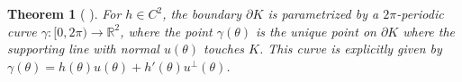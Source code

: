 \documentclass[11pt,letterpaper,reqno]{amsart}
\newcommand{\R}{\mathbb{R}}
\newtheorem{theorem}{Theorem}[section]
\providecommand{\R}{\mathbb{R}}
\begin{document}
\begin{theorem}[\cite{Martini2019} 
]
\label{thm:contact}
For $h \in C^2$, the boundary $\partial K$ is parametrized by a $2\pi$-periodic curve $\gamma:[0,2\pi)\to\R^2$, where the point $\gamma(\theta)$ is the unique point on $\partial K$ where the supporting line with normal $u(\theta)$ touches $K$.
This curve is explicitly given by $\gamma(\theta) = h(\theta) u(\theta) + h'(\theta) u^\perp (\theta)$.
\end{theorem}
\end{document}
